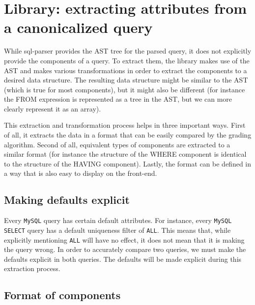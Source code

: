\section{Library: extracting attributes from a canonicalized query}

While sql-parser provides the AST tree for the parsed query, it does not explicitly provide the components of a query. To extract them, the library makes use of the AST and makes various transformations in order to extract the components to a desired data structure. The resulting data structure might be similar to the AST (which is true for most components), but it might also be different (for instance the FROM expression is represented as a tree in the AST, but we can more clearly represent it as an array).

This extraction and transformation process helps in three important ways. First of all, it extracts the data in a format that can be easily compared by the grading algorithm. Second of all, equivalent types of components are extracted to a similar format (for instance the structure of the WHERE component is identical to the structure of the HAVING component). Lastly, the format can be defined in a way that is also easy to display on the front-end.

\subsection{Making defaults explicit}

Every \texttt{MySQL} query has certain default attributes. For instance, every \texttt{MySQL SELECT} query has a default uniqueness filter of \texttt{ALL}. This means that, while explicitly mentioning \texttt{ALL} will have no effect, it does not mean that it is making the query wrong. In order to accurately compare two queries, we must make the defaults explicit in both queries. The defaults will be made explicit during this extraction process.

\subsection{Format of components}

